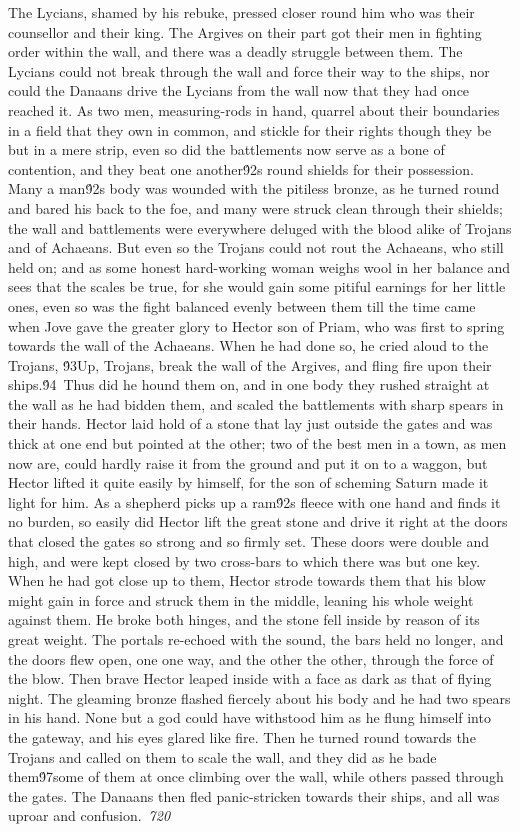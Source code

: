 {The Lycians, shamed by his rebuke, pressed closer round him who was their counsellor and their king. The Argives on their part got their men in fighting order within the wall, and there was a deadly struggle between them. The Lycians could not break through the wall and force their way to the ships, nor could the Danaans drive the Lycians from the wall now that they had once reached it. As two men, measuring-rods in hand, quarrel about their boundaries in a field that they own in common, and stickle for their rights though they be but in a mere strip, even so did the battlements now serve as a bone of contention, and they beat one another\'92s round shields for their possession. Many a man\'92s body was wounded with the pitiless bronze, as he turned round and bared his back to the foe, and many were struck clean through their shields; the wall and battlements were everywhere deluged with the blood alike of Trojans and of Achaeans. But even so the Trojans could not rout the Achaeans, who still held on; and as some honest hard-working woman weighs wool in her balance and sees that the scales be true, for she would gain some pitiful earnings for her little ones, even so was the fight balanced evenly between them till the time came when Jove gave the greater glory to Hector son of Priam, who was first to spring towards the wall of the Achaeans. When he had done so, he cried aloud to the Trojans, \'93Up, Trojans, break the wall of the Argives, and fling fire upon their ships.\'94\
Thus did he hound them on, and in one body they rushed straight at the wall as he had bidden them, and scaled the battlements with sharp spears in their hands. Hector laid hold of a stone that lay just outside the gates and was thick at one end but pointed at the other; two of the best men in a town, as men now are, could hardly raise it from the ground and put it on to a waggon, but Hector lifted it quite easily by himself, for the son of scheming Saturn made it light for him. As a shepherd picks up a ram\'92s fleece with one hand and finds it no burden, so easily did Hector lift the great stone and drive it right at the doors that closed the gates so strong and so firmly set. These doors were double and high, and were kept closed by two cross-bars to which there was but one key. When he had got close up to them, Hector strode towards them that his blow might gain in force and struck them in the middle, leaning his whole weight against them. He broke both hinges, and the stone fell inside by reason of its great weight. The portals re-echoed with the sound, the bars held no longer, and the doors flew open, one one way, and the other the other, through the force of the blow. Then brave Hector leaped inside with a face as dark as that of flying night. The gleaming bronze flashed fiercely about his body and he had two spears in his hand. None but a god could have withstood him as he flung himself into the gateway, and his eyes glared like fire. Then he turned round towards the Trojans and called on them to scale the wall, and they did as he bade them\'97some of them at once climbing over the wall, while others passed through the gates. The Danaans then fled panic-stricken towards their ships, and all was uproar and confusion.\
\pard{}\sl720\qc{}

}
